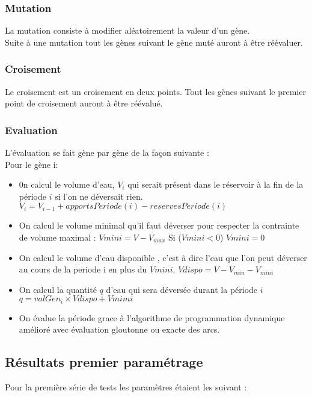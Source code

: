 \documentclass[a4paper]{report}
\begin{document}
 \subsubsection*{Mutation}
 La mutation consiste à modifier aléatoirement la valeur d'un gène.\\
 Suite à une mutation tout les gènes suivant le gène muté auront à être réévaluer.
 \subsubsection*{Croisement}
 Le croisement est un croisement en deux points. Tout les gènes suivant le premier point de croisement auront à être réévalué.
 \subsubsection*{Evaluation}
 L'évaluation se fait gène par gène de la façon suivante :\\
 Pour le gène i:\\
 \begin{itemize}
   \item 0n calcul le volume d'eau, $V_i$ qui serait présent dans le réservoir à la fin de la période $i$ si l'on ne déversait rien.
   \subitem $V_i =V_{i-1}+ apportsPeriode(i) - reservesPeriode(i)$
   
   \item On calcul le volume minimal qu'il faut déverser pour respecter la contrainte de volume maximal :
   \subitem $Vmini=V-V_{max}$
   \subitem Si ($Vmini <0$) $Vmini=0$
   \item On calcul le volume d'eau disponible , c'est à dire l'eau que l'on peut déverser au cours de la periode i en plus du $Vmini$.
   \subitem $Vdispo= V-V _{min} -V_{mini}$
   \item On calcul la quantité $q$ d'eau qui sera déversée durant la période $i$
   \subitem $q= valGen_i \times Vdispo + Vmimi$
   \item On évalue la période grace à l'algorithme de programmation dynamique amélioré avec évaluation gloutonne ou exacte des arcs. 
 \end{itemize}
\subsection{Résultats premier paramétrage}
Pour la première série de tests les paramètres étaient les suivant :\\
\end{document}
